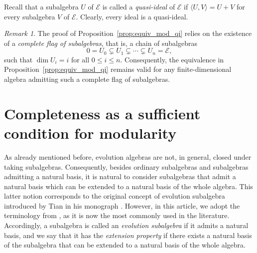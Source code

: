 \documentclass[12pt,reqno]{amsart}
\theoremstyle{plain}%
\theoremstyle{definition}
\theoremstyle{remark}
\newtheorem{remark}[theorem]{Remark}
\numberwithin{equation}{section}
\begin{document}
Recall that a subalgebra $U$ of $\mathcal{E}$ is called a \textit{quasi-ideal} of $\mathcal{E}$ if 
$\langle U,V\rangle=U+V$
for every subalgebra $V$ of $\mathcal{E}$. Clearly, every ideal is a quasi-ideal.

\begin{remark}\label{rem:flag}
The proof of Proposition~\ref{prop:equiv_mod_qi} relies on the existence of a \textit{complete flag of subalgebras}, that is, a chain of subalgebras
\[
0=U_0\subsetneq U_1\subsetneq\cdots\subsetneq U_n=\mathcal{E},
\]
such that $\dim U_i=i$ for all $0\le i\le n$. Consequently, the equivalence in Proposition~\ref{prop:equiv_mod_qi} remains valid for any finite-dimensional algebra admitting such a complete flag of subalgebras.
\end{remark}


\section{Completeness as a sufficient condition for modularity}\label{sec:3}
As already mentioned before, evolution algebras are not, in general, closed under taking subalgebras. Consequently, besides ordinary subalgebras and subalgebras admitting a natural basis, it is natural to consider subalgebras that admit a natural basis which can be extended to a natural basis of the whole algebra. This latter notion corresponds to the original concept of evolution subalgebra introduced by Tian in his monograph \cite[Definition~4, p.~23]{Tian_08}. However, in this article, we adopt the terminology from \cite[Definition~1.4.3]{thesis_yolanda}, as it is now the most commonly used in the literature. Accordingly, a subalgebra is called an \textit{evolution subalgebra} if it admits a natural basis, and we say that it has the \textit{extension property} if there exists a natural basis of the subalgebra that can be extended to a natural basis of the whole algebra.
\end{document}
